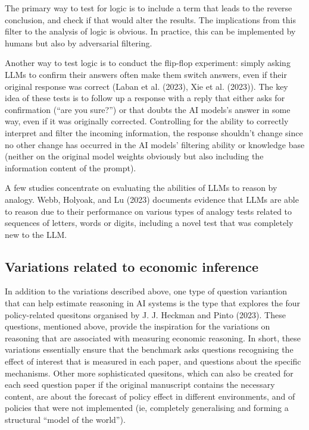 \documentclass[
]{article}
\begin{document}
The primary way to test for logic is to include a term that leads to the
reverse conclusion, and check if that would alter the results. The
implications from this filter to the analysis of logic is obvious. In
practice, this can be implemented by humans but also by adversarial
filtering.

Another way to test logic is to conduct the flip-flop experiment: simply
asking LLMs to confirm their answers often make them switch answers,
even if their original response was correct (Laban et al. (2023), Xie et
al. (2023)). The key idea of these tests is to follow up a response with
a reply that either asks for confirmation (``are you sure?'') or that
doubts the AI models's answer in some way, even if it was originally
corrected. Controlling for the ability to correctly interpret and filter
the incoming information, the response shouldn't change since no other
change has occurred in the AI models' filtering ability or knowledge
base (neither on the original model weights obviously but also including
the information content of the prompt).

A few studies concentrate on evaluating the abilities of LLMs to reason
by analogy. Webb, Holyoak, and Lu (2023) documents evidence that LLMs
are able to reason due to their performance on various types of analogy
tests related to sequences of letters, words or digits, including a
novel test that was completely new to the LLM.

\subsection{Variations related to economic
inference}\label{variations-related-to-economic-inference}

In addition to the variations described above, one type of question
variantion that can help estimate reasoning in AI systems is the type
that explores the four policy-related quesitons organised by J. J.
Heckman and Pinto (2023). These questions, mentioned above, provide the
inspiration for the variations on reasoning that are associated with
measuring economic reasoning. In short, these variations essentially
ensure that the benchmark asks questions recognising the effect of
interest that is measured in each paper, and questions about the
specific mechanisms. Other more sophisticated quesitons, which can also
be created for each seed question paper if the original manuscript
contains the necessary content, are about the forecast of policy effect
in different environments, and of policies that were not implemented
(ie, completely generalising and forming a structural ``model of the
world'').
\end{document}
